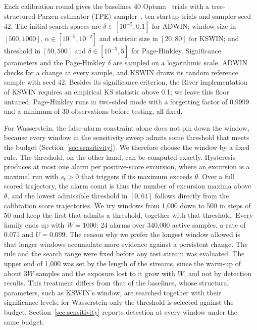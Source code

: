 \documentclass[preprint,12pt]{elsarticle}
\begin{document}
Each calibration round gives the baselines 40 Optuna~\cite{akiba2019optuna} trials with a tree-structured Parzen estimator (TPE) sampler~\cite{bergstra2011algorithms}, ten startup trials and sampler seed 42. The initial search spaces are $\delta\in[10^{-5},0.1]$ for ADWIN; window size in $[500,1000]$, $\alpha\in[10^{-5},10^{-2}]$ and statistic size in $[20,80]$ for KSWIN; and threshold in $[50,500]$ and $\delta\in[10^{-5},5]$ for Page-Hinkley. Significance parameters and the Page-Hinkley $\delta$ are sampled on a logarithmic scale. ADWIN checks for a change at every sample, and KSWIN draws its random reference sample with seed 42. Besides its significance criterion, the River implementation of KSWIN requires an empirical KS statistic above 0.1; we leave this floor untuned. Page-Hinkley runs in two-sided mode with a forgetting factor of 0.9999 and a minimum of 30 observations before testing, all fixed.

For Wasserstein, the false-alarm constraint alone does not pin down the window, because every window in the sensitivity sweep admits some threshold that meets the budget (Section~\ref{sec:sensitivity}). We therefore choose the window by a fixed rule. The threshold, on the other hand, can be computed exactly. Hysteresis produces at most one alarm per positive-score excursion, where an excursion is a maximal run with $s_t>0$ that triggers if its maximum exceeds $\theta$. Over a full scored trajectory, the alarm count is thus the number of excursion maxima above $\theta$, and the lowest admissible threshold in $[0,64]$ follows directly from the calibration score trajectories. We try windows from 1,000 down to 500 in steps of 50 and keep the first that admits a threshold, together with that threshold. Every family ends up with $W=1000$: 24 alarms over 340,000 active samples, a rate of 0.071 and $U=0.099$. The reason why we prefer the longest window allowed is that longer windows accumulate more evidence against a persistent change. The rule and the search range were fixed before any test stream was evaluated. The upper end of 1,000 was set by the length of the streams, since the warm-up of about $3W$ samples and the exposure lost to it grow with $W$, and not by detection results. This treatment differs from that of the baselines, whose structural parameters, such as KSWIN's window, are searched together with their significance levels; for Wasserstein only the threshold is selected against the budget. Section~\ref{sec:sensitivity} reports detection at every window under the same budget.
\end{document}
